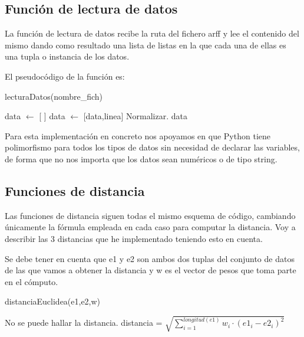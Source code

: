 \documentclass[12pt,a4paper]{article}
\begin{document}
	\subsection{Función de lectura de datos}

	La función de lectura de datos recibe la ruta del fichero arff y lee el contenido del mismo dando como resultado una lista de listas en la que cada una de ellas es una tupla o instancia de los datos.

	El pseudocódigo de la función es:

	\begin{algorithm}
		\caption{lecturaDatos(nombre\_fich)}
		\label{algoritmoLecturaDatos}
		\begin{algorithmic}
			\STATE data $\leftarrow$ [ ]
					\STATE data $\leftarrow$ [data,linea]
				\ENDIF
			\ENDFOR
				\STATE Normalizar.
				\ENDFOR
			\ENDFOR
			\RETURN data
		\end{algorithmic}
	\end{algorithm}

	Para esta implementación en concreto nos apoyamos en que Python tiene polimorfismo para todos los tipos de datos sin necesidad de declarar las variables, de forma que no nos importa que los datos sean numéricos o de tipo string.

	\subsection{Funciones de distancia}

	Las funciones de distancia siguen todas el mismo esquema de código, cambiando únicamente la fórmula empleada en cada caso para computar la distancia. Voy a describir las 3 distancias que he implementado teniendo esto en cuenta.

	Se debe tener en cuenta que e1 y e2 son ambos dos tuplas del conjunto de datos de las que vamos a obtener la distancia y w es el vector de pesos que toma parte en el cómputo.

	\begin{algorithm}
		\caption{distanciaEuclidea(e1,e2,w)}
		\begin{algorithmic}
			\IF{longitud(e1)!=longitud(e2)}
				\STATE No se puede hallar la distancia.
			\ELSE
				\STATE distancia = $\sqrt{\sum_{i=1}^{longitud(e1)}w_i\cdot (e1_i - e2_i)^2}$
			\ENDIF
		\end{algorithmic}
	\end{algorithm}
\end{document}
